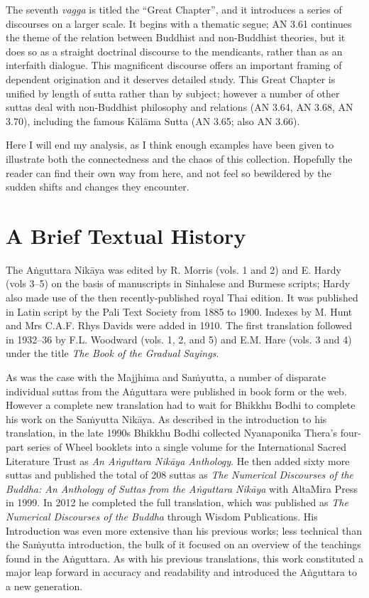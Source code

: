 \documentclass[12pt,openany]{book}%
\begin{document}
The seventh \textit{vagga} is titled the “Great Chapter”, and it introduces a series of discourses on a larger scale. It begins with a thematic segue; AN 3.61 continues the theme of the relation between Buddhist and non-Buddhist theories, but it does so as a straight doctrinal discourse to the mendicants, rather than as an interfaith dialogue. This magnificent discourse offers an important framing of dependent origination and it deserves detailed study. This Great Chapter is unified by length of sutta rather than by subject; however a number of other suttas deal with non-Buddhist philosophy and relations (AN 3.64, AN 3.68, AN 3.70), including the famous \textsanskrit{Kālāma} Sutta (AN 3.65; also AN 3.66).

Here I will end my analysis, as I think enough examples have been given to illustrate both the connectedness and the chaos of this collection. Hopefully the reader can find their own way from here, and not feel so bewildered by the sudden shifts and changes they encounter.

\section*{A Brief Textual History}

The \textsanskrit{Aṅguttara} \textsanskrit{Nikāya} was edited by R. Morris (vols. 1 and 2) and E. Hardy (vols 3–5) on the basis of manuscripts in Sinhalese and Burmese scripts; Hardy also made use of the then recently-published royal Thai edition. It was published in Latin script by the Pali Text Society from 1885 to 1900. Indexes by M. Hunt and Mrs C.A.F. Rhys Davids were added in 1910. The first translation followed in 1932–36 by F.L. Woodward (vols. 1, 2, and 5) and E.M. Hare (vols. 3 and 4) under the title \textit{The Book of the Gradual Sayings}.

As was the case with the Majjhima and \textsanskrit{Saṁyutta}, a number of disparate individual suttas from the \textsanskrit{Aṅguttara} were published in book form or the web. However a complete new translation had to wait for Bhikkhu Bodhi to complete his work on the \textsanskrit{Saṁyutta} \textsanskrit{Nikāya}. As described in the introduction to his translation, in the late 1990s Bhikkhu Bodhi collected Nyanaponika Thera’s four-part series of Wheel booklets into a single volume for the International Sacred Literature Trust as \textit{An \textsanskrit{Aṅguttara} \textsanskrit{Nikāya} Anthology}. He then added sixty more suttas and published the total of 208 suttas as \textit{The Numerical Discourses of the Buddha: An Anthology of Suttas from the \textsanskrit{Aṅguttara} \textsanskrit{Nikāya}} with AltaMira Press in 1999. In 2012 he completed the full translation, which was published as \textit{The Numerical Discourses of the Buddha} through Wisdom Publications. His Introduction was even more extensive than his previous works; less technical than the \textsanskrit{Saṁyutta} introduction, the bulk of it focused on an overview of the teachings found in the \textsanskrit{Aṅguttara}. As with his previous translations, this work constituted a major leap forward in accuracy and readability and introduced the \textsanskrit{Aṅguttara} to a new generation.
\end{document}
